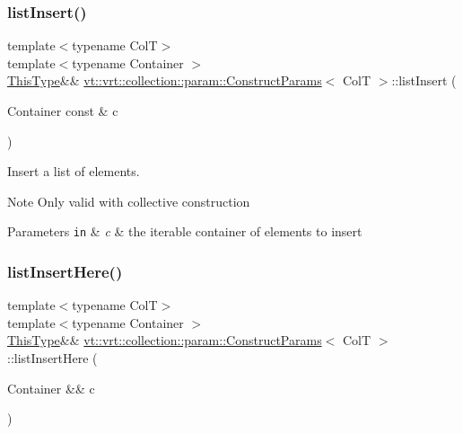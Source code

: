 \subsubsection{\texorpdfstring{list\+Insert()}{listInsert()}\hspace{0.1cm}{\footnotesize\ttfamily [2/2]}}
{\footnotesize\ttfamily template$<$typename ColT$>$ \\
template$<$typename Container $>$ \\
\hyperlink{structvt_1_1vrt_1_1collection_1_1param_1_1_construct_params_a13d4910c0f6825c7b0ddfebce5288bea}{This\+Type}\&\& \hyperlink{structvt_1_1vrt_1_1collection_1_1param_1_1_construct_params}{vt\+::vrt\+::collection\+::param\+::\+Construct\+Params}$<$ ColT $>$\+::list\+Insert (\begin{DoxyParamCaption}\item[{Container const \&}]{c }\end{DoxyParamCaption})\hspace{0.3cm}{\ttfamily [inline]}}



Insert a list of elements. 

\begin{DoxyNote}{Note}
Only valid with collective construction
\end{DoxyNote}

\begin{DoxyParams}[1]{Parameters}
\mbox{\tt in}  & {\em c} & the iterable container of elements to insert \\
\hline
\end{DoxyParams}
\mbox{\label{structvt_1_1vrt_1_1collection_1_1param_1_1_construct_params_a7e41be76dfbb53f0709983801f7dec83}} 
\subsubsection{\texorpdfstring{list\+Insert\+Here()}{listInsertHere()}\hspace{0.1cm}{\footnotesize\ttfamily [1/2]}}
{\footnotesize\ttfamily template$<$typename ColT$>$ \\
template$<$typename Container $>$ \\
\hyperlink{structvt_1_1vrt_1_1collection_1_1param_1_1_construct_params_a13d4910c0f6825c7b0ddfebce5288bea}{This\+Type}\&\& \hyperlink{structvt_1_1vrt_1_1collection_1_1param_1_1_construct_params}{vt\+::vrt\+::collection\+::param\+::\+Construct\+Params}$<$ ColT $>$\+::list\+Insert\+Here (\begin{DoxyParamCaption}\item[{Container \&\&}]{c }\end{DoxyParamCaption})\hspace{0.3cm}{\ttfamily [inline]}}



